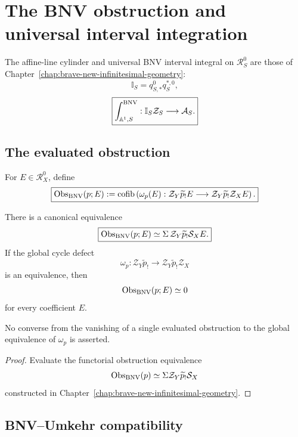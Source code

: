 \section{The BNV obstruction and universal interval integration}
\label{sec:dr-int-bnv}

The affine-line cylinder and universal BNV interval integral on
\(\mathcal R_S^0\) are those of
Chapter~\ref{chap:brave-new-infinitesimal-geometry}:
\[
    \mathbb I_S=q_{S,*}^0q_S^{*,0},
\]
\[
\boxed{
    \int^{\mathrm{BNV}}_{\mathbb A^1,S}:
    \mathbb I_S\mathcal Z_S
    \longrightarrow
    \mathcal A_S.
}
\]

\subsection{The evaluated obstruction}

\begin{definition}
\label{def:dr-int-evaluated-bnv-obstruction}
For \(E\in\mathcal R_X^0\), define
\[
\boxed{
    \operatorname{Obs}_{\mathrm{BNV}}(p;E)
    :=
    \operatorname{cofib}
    \left(
        \omega_p(E):
        \mathcal Z_Y\widetilde p_!E
        \longrightarrow
        \mathcal Z_Y\widetilde p_!\mathcal Z_XE
    \right).
}
\]
\end{definition}

\begin{proposition}
\label{prop:dr-int-evaluated-bnv-obstruction}
There is a canonical equivalence
\[
\boxed{
    \operatorname{Obs}_{\mathrm{BNV}}(p;E)
    \simeq
    \Sigma\,
    \mathcal Z_Y
    \widetilde p_!
    \mathcal S_XE.
}
\]
If the global cycle defect
\[
    \omega_p:
    \mathcal Z_Y\widetilde p_!
    \longrightarrow
    \mathcal Z_Y\widetilde p_!\mathcal Z_X
\]
is an equivalence, then
\[
    \operatorname{Obs}_{\mathrm{BNV}}(p;E)\simeq0
\]
for every coefficient \(E\).

No converse from the vanishing of a single evaluated obstruction to the global
equivalence of \(\omega_p\) is asserted.
\end{proposition}

\begin{proof}
Evaluate the functorial obstruction equivalence
\[
    \operatorname{Obs}_{\mathrm{BNV}}(p)
    \simeq
    \Sigma\mathcal Z_Y\widetilde p_!\mathcal S_X
\]
constructed in Chapter~\ref{chap:brave-new-infinitesimal-geometry}.
\end{proof}

\subsection{BNV--Umkehr compatibility}

